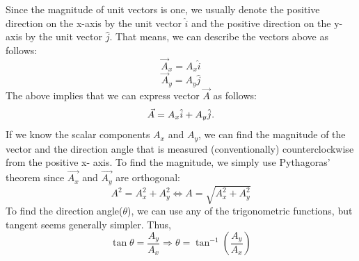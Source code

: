 \documentclass[9pt]{article}
\begin{document}
Since the magnitude of unit vectors is one, we usually denote the positive direction on the x-axis by the unit vector  $\hat{i}$
and the positive direction on the y-axis by the unit vector  $\hat{j}$. That means, we can describe the vectors above as follows:
$$\vec{A}_{x} = A_{x} \hat{i}$$
$$\vec{A}_{y} = A_{y} \hat{j}$$
The above implies that we can express vector $\vec{A}$ as follows:
$$\vec{A} = A_{x} \hat{i} + A_{y} \hat{j} \ldotp \label{2.12}$$
If we know the scalar components $A_x$ and $A_y$, we can find the magnitude of the vector and the direction angle that is measured (conventionally) counterclockwise from the positive x- axis. To find the magnitude, we simply use Pythagoras' theorem since $\vec{A_x}$ and $\vec{A_y}$ are orthogonal:
$$A^{2} = A_{x}^{2} + A_{y}^{2} \Leftrightarrow A = \sqrt{A_{x}^{2} + A_{y}^{2}} $$
To find the direction angle($\theta$), we can use any of the trigonometric functions, but tangent seems generally simpler. Thus,
$$\tan \theta = \frac{A_{y}}{A_{x}} \Rightarrow \theta = \tan^{-1} \left(\dfrac{A_{y}}{A_{x}}\right)$$
\end{document}
